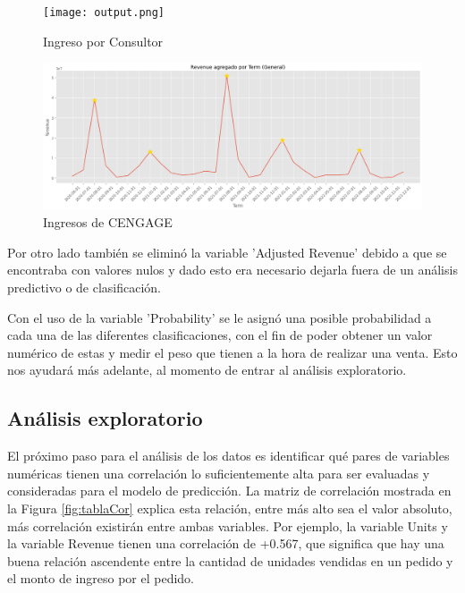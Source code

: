 \documentclass{article}
\begin{document}
        \newpage
        \begin{figure}[h]
            \centering
            \texttt{[image: output.png]}
            \caption{Ingreso por Consultor}
            \label{fig:revenueCons}
        \end{figure}


        \begin{figure}[h]
            \centering
            \includegraphics[width = \columnwidth]{revenue.png}
            \caption{Ingresos de CENGAGE}
            \label{fig:revenue}
        \end{figure}

        Por otro lado también se eliminó la variable 'Adjusted Revenue' debido a que se encontraba con valores nulos y dado esto era necesario dejarla fuera de un análisis predictivo o de clasificación.


        
        \vspace{3 mm}
        
        Con el uso de la variable 'Probability' se le asignó una posible probabilidad a cada una de las diferentes clasificaciones, con el fin de poder obtener un valor numérico de estas y medir el peso que tienen a la hora de realizar una venta. Esto nos ayudará más adelante, al momento de entrar al análisis exploratorio.
        
        \subsection{Análisis exploratorio}
        
        El próximo paso para el análisis de los datos es identificar qué pares de variables numéricas tienen una correlación lo suficientemente alta para ser evaluadas y consideradas para el modelo de predicción. La matriz de correlación mostrada en la Figura \ref{fig:tablaCor} explica esta relación, entre más alto sea el valor absoluto, más correlación existirán entre ambas variables. Por ejemplo, la variable Units y la variable Revenue tienen una correlación de +0.567, que significa que hay una buena relación ascendente entre la cantidad de unidades vendidas en un pedido y el monto de ingreso por el pedido.
\end{document}
